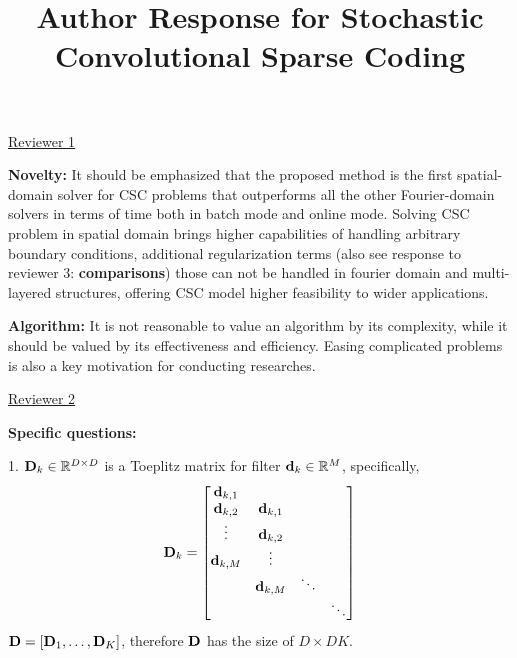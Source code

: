 \documentclass[10pt,twocolumn,letterpaper]{article}
\begin{document}
\title{Author Response for Stochastic Convolutional Sparse Coding}  %

\maketitle
\thispagestyle{empty}

\underline{Reviewer 1}

\textbf{Novelty:}
It should be emphasized that the proposed method is the first spatial-domain solver for CSC problems that outperforms all the other Fourier-domain solvers in terms of time both in batch mode and online mode. Solving CSC problem in spatial domain brings higher capabilities of handling arbitrary boundary conditions, additional regularization terms (also see response to reviewer 3: \textbf{comparisons}) those can not be handled in fourier domain and multi-layered structures, offering CSC model higher feasibility to wider applications.

\textbf{Algorithm:}
It is not reasonable to value an algorithm by its complexity, while it should be valued by its effectiveness and efficiency. Easing complicated problems is also a key motivation for conducting researches.

\underline{Reviewer 2}

\textbf{Specific questions:}

1. $\Filter_k \in \mathbb{R}^{D \times D}$ is a Toeplitz matrix for filter $\filter_k \in \mathbb{R}^{M}$, specifically,
\begin{equation}\label{toeplitz}
 \Filter_k =
 \begin{bmatrix}
    \filter_{k,1} \\
    \filter_{k,2} & \filter_{k,1}\\
    \vdots        & \filter_{k,2}\\
    \filter_{k,M} & \vdots       \\
                  & \filter_{k,M} & \ddots\\
                  &               &        & \ddots
  \end{bmatrix}
\end{equation}
$\Filter = [\Filter_1, \dots, \Filter_K]$, therefore $\Filter$ has the size of $D \times DK$.
\end{document}
